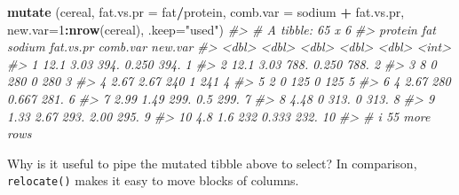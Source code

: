 \documentclass[
]{book}
\newenvironment{Shaded}{\begin{snugshade}}{\end{snugshade}}
\newcommand{\AttributeTok}[1]{\textcolor[rgb]{0.13,0.29,0.53}{#1}}
\newcommand{\CommentTok}[1]{\textcolor[rgb]{0.56,0.35,0.01}{\textit{#1}}}
\newcommand{\DecValTok}[1]{\textcolor[rgb]{0.00,0.00,0.81}{#1}}
\newcommand{\FunctionTok}[1]{\textcolor[rgb]{0.13,0.29,0.53}{\textbf{#1}}}
\newcommand{\NormalTok}[1]{#1}
\newcommand{\SpecialCharTok}[1]{\textcolor[rgb]{0.81,0.36,0.00}{\textbf{#1}}}
\newcommand{\StringTok}[1]{\textcolor[rgb]{0.31,0.60,0.02}{#1}}
\begin{document}
\begin{Shaded}
\begin{Highlighting}[]
\FunctionTok{mutate}\NormalTok{ (cereal, }\AttributeTok{fat.vs.pr =}\NormalTok{ fat}\SpecialCharTok{/}\NormalTok{protein, }
                 \AttributeTok{comb.var =}\NormalTok{ sodium }\SpecialCharTok{+}\NormalTok{ fat.vs.pr,}
                 \AttributeTok{new.var=}\DecValTok{1}\SpecialCharTok{:}\FunctionTok{nrow}\NormalTok{(cereal), }\AttributeTok{.keep=}\StringTok{"used"}\NormalTok{)}
\CommentTok{\#\textgreater{} \# A tibble: 65 x 6}
\CommentTok{\#\textgreater{}    protein   fat sodium fat.vs.pr comb.var new.var}
\CommentTok{\#\textgreater{}      \textless{}dbl\textgreater{} \textless{}dbl\textgreater{}  \textless{}dbl\textgreater{}     \textless{}dbl\textgreater{}    \textless{}dbl\textgreater{}   \textless{}int\textgreater{}}
\CommentTok{\#\textgreater{}  1   12.1   3.03   394.     0.250     394.       1}
\CommentTok{\#\textgreater{}  2   12.1   3.03   788.     0.250     788.       2}
\CommentTok{\#\textgreater{}  3    8     0      280      0         280        3}
\CommentTok{\#\textgreater{}  4    2.67  2.67   240      1         241        4}
\CommentTok{\#\textgreater{}  5    2     0      125      0         125        5}
\CommentTok{\#\textgreater{}  6    4     2.67   280      0.667     281.       6}
\CommentTok{\#\textgreater{}  7    2.99  1.49   299.     0.5       299.       7}
\CommentTok{\#\textgreater{}  8    4.48  0      313.     0         313.       8}
\CommentTok{\#\textgreater{}  9    1.33  2.67   293.     2.00      295.       9}
\CommentTok{\#\textgreater{} 10    4.8   1.6    232      0.333     232.      10}
\CommentTok{\#\textgreater{} \# i 55 more rows}
\end{Highlighting}
\end{Shaded}

Why is it useful to pipe the mutated tibble above to select? In comparison, \texttt{relocate()} makes it easy to move blocks of columns.
\end{document}
